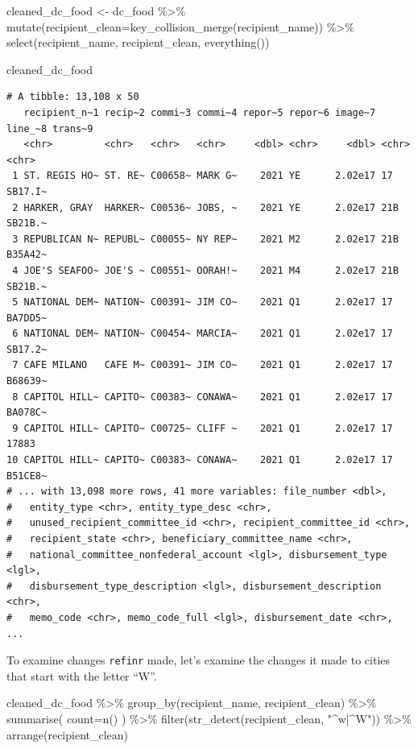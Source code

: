 \documentclass[
  letterpaper,
  DIV=11,
  numbers=noendperiod]{scrreprt}
\newenvironment{Shaded}{\begin{snugshade}}{\end{snugshade}}
\newcommand{\AttributeTok}[1]{\textcolor[rgb]{0.40,0.45,0.13}{#1}}
\newcommand{\FunctionTok}[1]{\textcolor[rgb]{0.28,0.35,0.67}{#1}}
\newcommand{\NormalTok}[1]{\textcolor[rgb]{0.00,0.23,0.31}{#1}}
\newcommand{\OtherTok}[1]{\textcolor[rgb]{0.00,0.23,0.31}{#1}}
\newcommand{\SpecialCharTok}[1]{\textcolor[rgb]{0.37,0.37,0.37}{#1}}
\newcommand{\StringTok}[1]{\textcolor[rgb]{0.13,0.47,0.30}{#1}}
\begin{document}
\begin{Shaded}
\begin{Highlighting}[]
\NormalTok{cleaned\_dc\_food }\OtherTok{\textless{}{-}}\NormalTok{ dc\_food }\SpecialCharTok{\%\textgreater{}\%}
  \FunctionTok{mutate}\NormalTok{(}\AttributeTok{recipient\_clean=}\FunctionTok{key\_collision\_merge}\NormalTok{(recipient\_name)) }\SpecialCharTok{\%\textgreater{}\%}
  \FunctionTok{select}\NormalTok{(recipient\_name, recipient\_clean, }\FunctionTok{everything}\NormalTok{())}

\NormalTok{cleaned\_dc\_food}
\end{Highlighting}
\end{Shaded}

\begin{verbatim}
# A tibble: 13,108 x 50
   recipient_n~1 recip~2 commi~3 commi~4 repor~5 repor~6 image~7 line_~8 trans~9
   <chr>         <chr>   <chr>   <chr>     <dbl> <chr>     <dbl> <chr>   <chr>  
 1 ST. REGIS HO~ ST. RE~ C00658~ MARK G~    2021 YE      2.02e17 17      SB17.I~
 2 HARKER, GRAY  HARKER~ C00536~ JOBS, ~    2021 YE      2.02e17 21B     SB21B.~
 3 REPUBLICAN N~ REPUBL~ C00055~ NY REP~    2021 M2      2.02e17 21B     B35A42~
 4 JOE'S SEAFOO~ JOE'S ~ C00551~ OORAH!~    2021 M4      2.02e17 21B     SB21B.~
 5 NATIONAL DEM~ NATION~ C00391~ JIM CO~    2021 Q1      2.02e17 17      BA7DD5~
 6 NATIONAL DEM~ NATION~ C00454~ MARCIA~    2021 Q1      2.02e17 17      SB17.2~
 7 CAFE MILANO   CAFE M~ C00391~ JIM CO~    2021 Q1      2.02e17 17      B68639~
 8 CAPITOL HILL~ CAPITO~ C00383~ CONAWA~    2021 Q1      2.02e17 17      BA078C~
 9 CAPITOL HILL~ CAPITO~ C00725~ CLIFF ~    2021 Q1      2.02e17 17      17883  
10 CAPITOL HILL~ CAPITO~ C00383~ CONAWA~    2021 Q1      2.02e17 17      B51CE8~
# ... with 13,098 more rows, 41 more variables: file_number <dbl>,
#   entity_type <chr>, entity_type_desc <chr>,
#   unused_recipient_committee_id <chr>, recipient_committee_id <chr>,
#   recipient_state <chr>, beneficiary_committee_name <chr>,
#   national_committee_nonfederal_account <lgl>, disbursement_type <lgl>,
#   disbursement_type_description <lgl>, disbursement_description <chr>,
#   memo_code <chr>, memo_code_full <lgl>, disbursement_date <chr>, ...
\end{verbatim}

To examine changes \texttt{refinr} made, let's examine the changes it
made to cities that start with the letter ``W''.

\begin{Shaded}
\begin{Highlighting}[]
\NormalTok{cleaned\_dc\_food }\SpecialCharTok{\%\textgreater{}\%}
  \FunctionTok{group\_by}\NormalTok{(recipient\_name, recipient\_clean) }\SpecialCharTok{\%\textgreater{}\%}
  \FunctionTok{summarise}\NormalTok{(}
    \AttributeTok{count=}\FunctionTok{n}\NormalTok{()}
\NormalTok{  ) }\SpecialCharTok{\%\textgreater{}\%}
  \FunctionTok{filter}\NormalTok{(}\FunctionTok{str\_detect}\NormalTok{(recipient\_clean, }\StringTok{"\^{}w|\^{}W"}\NormalTok{)) }\SpecialCharTok{\%\textgreater{}\%}
  \FunctionTok{arrange}\NormalTok{(recipient\_clean)}
\end{Highlighting}
\end{Shaded}
\end{document}
